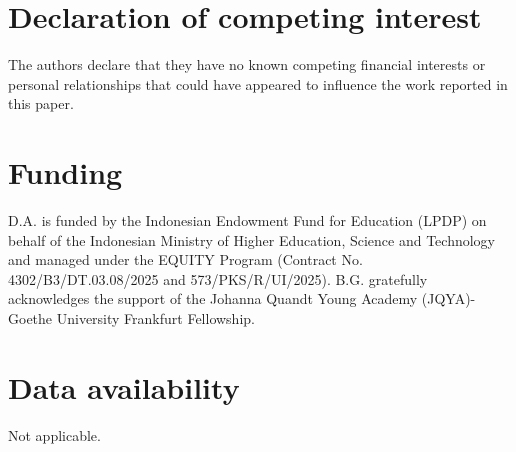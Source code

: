 \documentclass[preprint]{elsarticle}
\begin{document}
\section*{Declaration of competing interest}
The authors declare that they have no known competing financial interests or personal relationships that could have appeared to influence the work reported in this paper.

\section*{Funding}
D.A. is funded by the Indonesian Endowment Fund for Education (LPDP) on behalf of the Indonesian Ministry of Higher Education, Science and Technology and managed under the EQUITY Program (Contract No. 4302/B3/DT.03.08/2025 and 573/PKS/R/UI/2025). B.G. gratefully acknowledges the support of the Johanna Quandt Young Academy (JQYA)-Goethe University Frankfurt Fellowship.

\section*{Data availability}
Not applicable.




\end{document}
